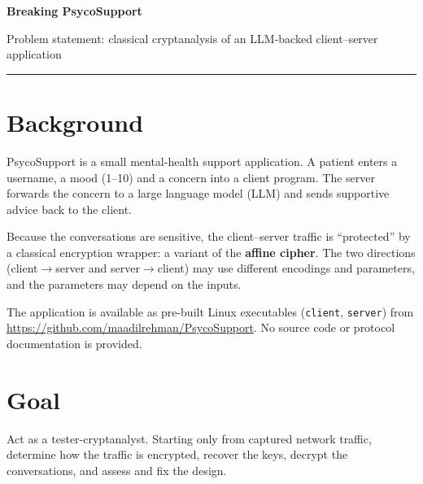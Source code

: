 \documentclass[11pt,a4paper]{article}
\newcommand{\ct}[1]{\texttt{#1}}
\begin{document}
{\LARGE\bfseries Breaking PsycoSupport\par}
\vspace{0.2em}
{\large Problem statement: classical cryptanalysis of an LLM-backed client--server application\par}
\vspace{0.8em}
\hrule
\vspace{0.8em}

\section*{Background}
PsycoSupport is a small mental-health support application. A patient enters a username, a mood (1--10) and a
concern into a client program. The server forwards the concern to a large language model (LLM) and sends supportive
advice back to the client.

Because the conversations are sensitive, the client--server traffic is ``protected'' by a classical encryption
wrapper: a variant of the \textbf{affine cipher}. The two directions (client$\rightarrow$server and
server$\rightarrow$client) may use different encodings and parameters, and the parameters may depend on the inputs.

The application is available as pre-built Linux executables (\ct{client}, \ct{server}) from
\url{https://github.com/maadilrehman/PsycoSupport}. No source code or protocol documentation is provided.

\section*{Goal}
Act as a tester-cryptanalyst. Starting only from captured network traffic, determine how the traffic is encrypted,
recover the keys, decrypt the conversations, and assess and fix the design.
\end{document}
